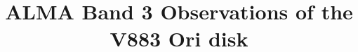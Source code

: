 \documentclass[linenumbers, twocolumn, twocolappendix, astrosymb, times]{aastex631}
\begin{document}
\title{ALMA Band 3 Observations of the V883 Ori disk}


\end{document}
